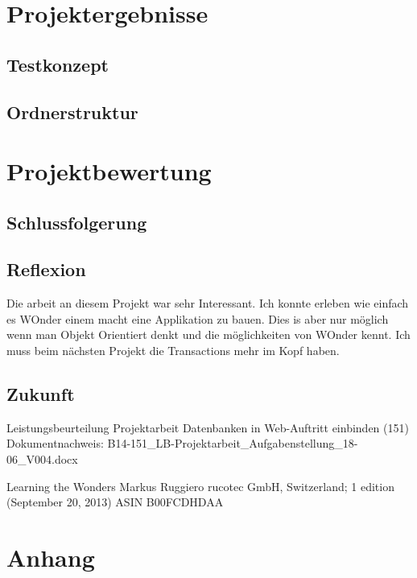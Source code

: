 \documentclass[a4paper, 11pt]{article}
\begin{document}
\section{Projektergebnisse}

\subsection{Testkonzept}

\subsection{Ordnerstruktur}

\section{Projektbewertung}

\subsection{Schlussfolgerung}

\subsection{Reflexion}

Die arbeit an diesem Projekt war sehr Interessant.
Ich konnte erleben wie einfach es WOnder einem macht eine Applikation zu bauen.
Dies is aber nur möglich wenn man Objekt Orientiert denkt und die möglichkeiten von WOnder kennt.
Ich muss beim nächsten Projekt die Transactions mehr im Kopf haben.

\subsection{Zukunft}

\begin{thebibliography}{9}
Leistungsbeurteilung Projektarbeit
Datenbanken in Web-Auftritt einbinden (151)
Dokumentnachweis: B14-151\_LB-Projektarbeit\_Aufgabenstellung\_18-06\_V004.docx

Learning the Wonders
Markus Ruggiero
rucotec GmbH, Switzerland; 1 edition (September 20, 2013)
ASIN B00FCDHDAA

\end{thebibliography}

\section{Anhang}
\end{document}
